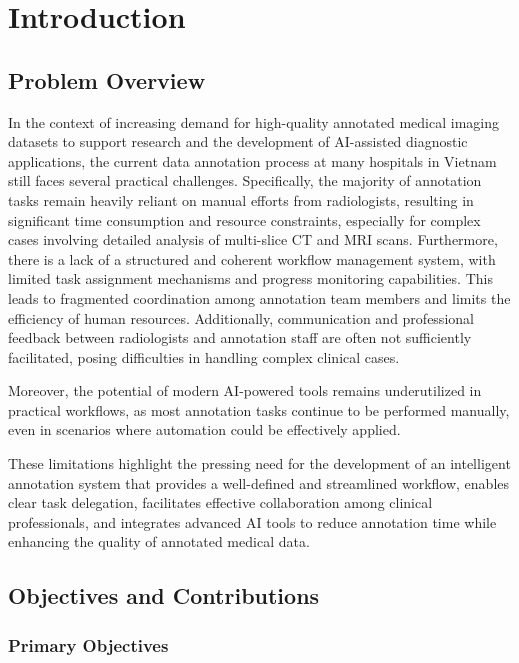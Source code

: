 \chapter{Introduction}

\section{Problem Overview}

In the context of increasing demand for high-quality annotated medical imaging datasets to support research and the development of AI-assisted diagnostic applications, the current data annotation process at many hospitals in Vietnam still faces several practical challenges. Specifically, the majority of annotation tasks remain heavily reliant on manual efforts from radiologists, resulting in significant time consumption and resource constraints, especially for complex cases involving detailed analysis of multi-slice CT and MRI scans. Furthermore, there is a lack of a structured and coherent workflow management system, with limited task assignment mechanisms and progress monitoring capabilities. This leads to fragmented coordination among annotation team members and limits the efficiency of human resources. Additionally, communication and professional feedback between radiologists and annotation staff are often not sufficiently facilitated, posing difficulties in handling complex clinical cases.

Moreover, the potential of modern AI-powered tools remains underutilized in practical workflows, as most annotation tasks continue to be performed manually, even in scenarios where automation could be effectively applied.

These limitations highlight the pressing need for the development of an intelligent annotation system that provides a well-defined and streamlined workflow, enables clear task delegation, facilitates effective collaboration among clinical professionals, and integrates advanced AI tools to reduce annotation time while enhancing the quality of annotated medical data.

\section{Objectives and Contributions}

\subsection{Primary Objectives}

